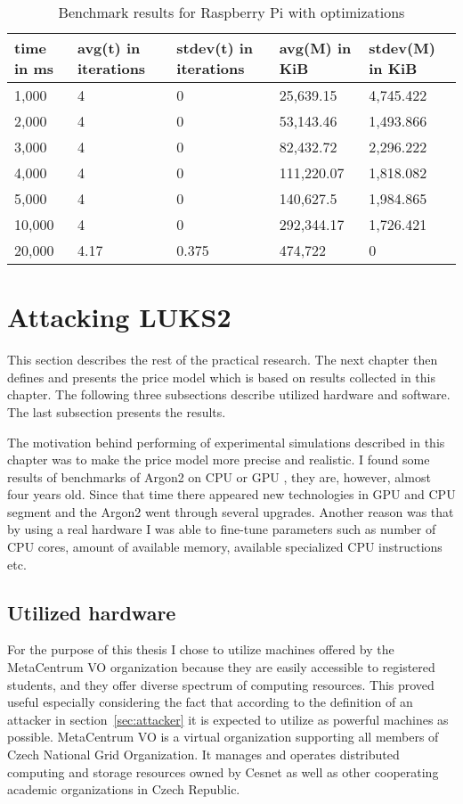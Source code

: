 \documentclass[nolof]{fithesis3}
\begin{document}
\noindent
\begin{table}
\caption{Benchmark results for Raspberry Pi with optimizations}
\label{tab:r4c1go}
\begin{tabularx}{\textwidth}{| X | X | X | X | X |}
\hline
time in ms & avg(t)  in iterations & stdev(t) in iterations & avg(M) in KiB & stdev(M) in KiB\\
\hline
1,000 & 4 & 0 & 25,639.15 & 4,745.422\\
\hline
2,000 & 4 & 0 & 53,143.46 & 1,493.866\\
\hline
3,000 & 4 & 0 & 82,432.72 & 2,296.222\\
\hline
4,000 & 4 & 0 & 111,220.07 & 1,818.082\\
\hline
5,000 & 4 & 0 & 140,627.5 & 1,984.865\\
\hline
10,000 & 4 & 0 & 292,344.17 & 1,726.421\\
\hline
20,000 & 4.17 & 0.375 & 474,722 & 0\\
\hline
\end{tabularx}
\end{table}


\FloatBarrier

\section{Attacking LUKS2}
\label{sec:attack}
This section describes the rest of the practical research. The next chapter then defines and presents the price model which is based on results collected in this chapter. The following three subsections describe utilized hardware and software. The last subsection presents the results.

The motivation behind performing of experimental simulations described in this chapter was to make the price model more precise and realistic. I found some results of benchmarks of Argon2 on CPU or GPU \parencite{argon2gpuold}, they are, however, almost four years old. Since that time there appeared new technologies in GPU and CPU segment and the Argon2 went through several upgrades. Another reason was that by using a real hardware I was able to fine-tune parameters such as number of CPU cores, amount of available memory, available specialized CPU instructions etc.

\subsection{Utilized hardware}
For the purpose of this thesis I chose to utilize machines offered by the MetaCentrum VO organization because they are easily accessible to registered students, and they offer diverse spectrum of computing resources. This proved useful especially considering the fact that according to the definition of an attacker in section~\ref{sec:attacker} it is expected to utilize as powerful machines as possible. MetaCentrum VO is a virtual organization supporting all members of Czech National Grid Organization. It manages and operates distributed  computing and storage resources owned by Cesnet as well as other cooperating academic organizations in Czech Republic.
\end{document}
